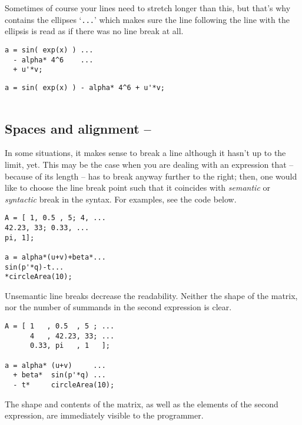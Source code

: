 Sometimes of course your lines need to stretch longer than this, but that's why \matlab{} contains the ellipses `\lstinline!...!' which makes sure the line following the line with the ellipsis is read as if there was no line break at all.

\hfill
\begin{minipage}[t]{.45\textwidth}
\begin{lstlisting}[framerule=2pt,rulecolor=\color{goodgreen}]
a = sin( exp(x) ) ...
  - alpha* 4^6    ...
  + u'*v;
\end{lstlisting}
\end{minipage}
\hfill
\begin{minipage}[t]{.45\textwidth}
\begin{lstlisting}[framerule=2pt,rulecolor=\color{badred}]
a = sin( exp(x) ) - alpha* 4^6 + u'*v;


\end{lstlisting}
\end{minipage}
\hfill


\subsection{Spaces and alignment -- \cleansymbol\cleansymbol\cleansymbol}\label{paragraph:alignment}
In some situations, it makes sense to break a line although it hasn't up to the limit, yet. This may be the case when you are dealing with an expression that -- because of its length -- has to break anyway further to the right; then, one would like to choose the line break point such that it coincides with \emph{semantic} or \emph{syntactic} break in the syntax. For examples, see the code below.

\hfill
\begin{minipage}[t]{.45\textwidth}
\begin{lstlisting}[framerule=2pt,rulecolor=\color{badred}]
A = [ 1, 0.5 , 5; 4, ...
42.23, 33; 0.33, ...
pi, 1];

a = alpha*(u+v)+beta*...
sin(p'*q)-t...
*circleArea(10);
\end{lstlisting}
Unsemantic line breaks decrease the readability. Neither the shape of the matrix, nor the number of summands in the second expression is clear.
\end{minipage}
\hfill
\begin{minipage}[t]{.45\textwidth}
\begin{lstlisting}[framerule=2pt,rulecolor=\color{goodgreen}]
A = [ 1   , 0.5  , 5 ; ...
      4   , 42.23, 33; ...
      0.33, pi   , 1   ];

a = alpha* (u+v)     ...
  + beta*  sin(p'*q) ...
  - t*     circleArea(10);
\end{lstlisting}
The shape and contents of the matrix, as well as the elements of the second expression, are immediately visible to the programmer.
\end{minipage}
\hfill

